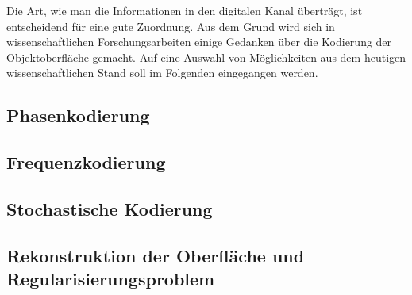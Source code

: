 \noindent
Die Art, wie man die Informationen in den digitalen Kanal überträgt, ist entscheidend für eine gute Zuordnung.
Aus dem Grund wird sich in wissenschaftlichen Forschungsarbeiten einige Gedanken über die Kodierung der Objektoberfläche gemacht.
Auf eine Auswahl von Möglichkeiten aus dem heutigen wissenschaftlichen Stand soll im Folgenden eingegangen werden.
%
{
	\FloatBarrier
    \subsection{Phasenkodierung}
    \label{sub:phasenKodierung}
    
}
%
{
	\FloatBarrier
    \subsection{Frequenzkodierung}
    \label{sub:frequenzKodierung}
    
}
%
{
	\FloatBarrier
    \subsection{Stochastische Kodierung}
    \label{sub:stochastischeKodierung}
    
}
%
{
	\FloatBarrier
    \subsection{Rekonstruktion der Oberfläche und Regularisierungsproblem}
    \label{sub:rekonstruktionUndRegularisierungsproblem}
    
}
%
